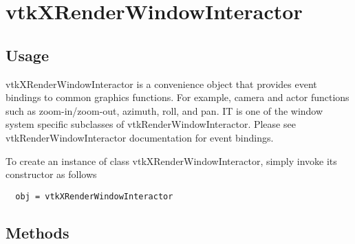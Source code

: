 \section{vtkXRenderWindowInteractor}

\subsection{Usage}

 vtkXRenderWindowInteractor is a convenience object that provides event
 bindings to common graphics functions. For example, camera and actor
 functions such as zoom-in/zoom-out, azimuth, roll, and pan. IT is one of
 the window system specific subclasses of vtkRenderWindowInteractor. Please
 see vtkRenderWindowInteractor documentation for event bindings.


To create an instance of class vtkXRenderWindowInteractor, simply
invoke its constructor as follows
\begin{verbatim}
  obj = vtkXRenderWindowInteractor
\end{verbatim}
\subsection{Methods}

